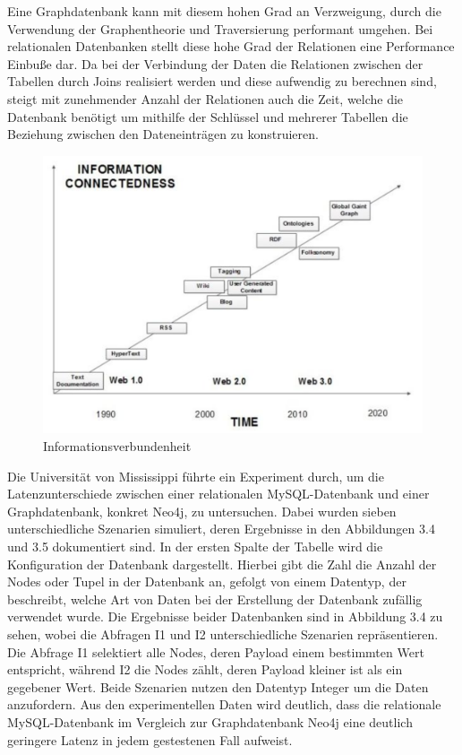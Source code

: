\noindent
Eine Graphdatenbank kann mit diesem hohen Grad an Verzweigung, durch die Verwendung der Graphentheorie und Traversierung performant umgehen.  Bei relationalen Datenbanken stellt diese hohe Grad der Relationen eine Performance Einbuße dar.  Da bei der Verbindung der Daten die Relationen zwischen der Tabellen durch Joins realisiert werden und diese aufwendig zu berechnen sind, steigt mit zunehmender Anzahl der Relationen auch die Zeit, welche die Datenbank benötigt um mithilfe der Schlüssel und mehrerer Tabellen die Beziehung zwischen den Dateneinträgen zu konstruieren. \citep{9677042} \citep{graphdb}
\begin{figure}[H]
	\centering
	\includegraphics[scale=.45]{Illustrations/informationconnectedness.png}
	\caption{Informationsverbundenheit \citep{performancenosql}}
\end{figure}
\noindent
Die Universität von Mississippi führte ein Experiment durch, um die Latenzunterschiede zwischen einer relationalen MySQL-Datenbank und einer Graphdatenbank, konkret Neo4j, zu untersuchen. Dabei wurden sieben unterschiedliche Szenarien simuliert, deren Ergebnisse in den Abbildungen 3.4 und 3.5 dokumentiert sind. In der ersten Spalte der Tabelle wird die Konfiguration der Datenbank dargestellt. Hierbei gibt die Zahl die Anzahl der Nodes oder Tupel in der Datenbank an, gefolgt von einem Datentyp, der beschreibt, welche Art von Daten bei der Erstellung der Datenbank zufällig verwendet wurde.
Die Ergebnisse beider Datenbanken sind in Abbildung 3.4 zu sehen, wobei die Abfragen I1 und I2 unterschiedliche Szenarien repräsentieren. Die Abfrage I1 selektiert alle Nodes, deren Payload einem bestimmten Wert entspricht, während I2 die Nodes zählt, deren Payload kleiner ist als ein gegebener Wert. Beide Szenarien nutzen den Datentyp Integer um die Daten anzufordern. Aus den experimentellen Daten wird deutlich, dass die relationale MySQL-Datenbank im Vergleich zur Graphdatenbank Neo4j eine deutlich geringere Latenz in jedem gestestenen Fall aufweist.
